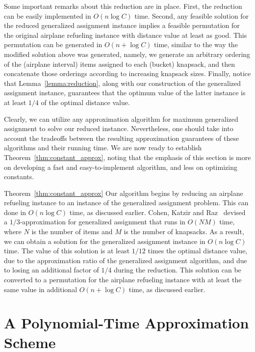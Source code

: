 \documentclass[11pt]{article}
\theoremstyle{plain}
\theoremstyle{definition}
\begin{document}
Some important remarks about this reduction are in place. First, the reduction can be easily implemented in $O(n \log C)$ time. Second, any feasible solution for the reduced generalized assignment instance implies a feasible permutation for the original airplane refueling instance with distance value at least as good. This permutation can be generated in $O(n + \log C)$ time, similar to the way the modified solution above was generated, namely, we generate an arbitrary ordering of the (airplane interval) items assigned to each (bucket) knapsack, and then concatenate those orderings according to increasing knapsack sizes. Finally, notice that Lemma~\ref{lemma:reduction}, along with our construction of the generalized assignment instance, guarantees that the optimum value of the latter instance is at least $1/4$ of the optimal distance value. 

\smallskip {} Clearly, we can utilize any approximation algorithm for maximum generalized assignment to solve our reduced instance. Nevertheless, one should take into account the tradeoffs between the resulting approximation guarantees of these algorithms and their running time. We are now ready to establish Theorem~\ref{thm:constant_approx}, noting that the emphasis of this section is more on developing a fast and easy-to-implement algorithm, and less on optimizing constants.

\begin{proofof}{Theorem~\ref{thm:constant_approx}}
Our algorithm begins by reducing an airplane refueling instance to an instance of the generalized assignment problem. This can done in $O(n \log C)$ time, as discussed earlier. Cohen, Katzir and Raz~\cite{CohenKR06} devised a $1/3$-approximation for generalized assignment that runs in $O(NM)$ time, where $N$ is the number of items and $M$ is the number of knapsacks. As a result, we can obtain a solution for the generalized assignment instance in $O(n \log C)$ time. The value of this solution is at least $1/12$ times the optimal distance value, due to the approximation ratio of the generalized assignment algorithm, and due to losing an additional factor of $1/4$ during the reduction. This solution can be converted to a permutation for the airplane refueling instance with at least the same value in additional $O(n + \log C)$ time, as discussed earlier.
\end{proofof}



\section{A Polynomial-Time Approximation Scheme} \label{sec:ptas}
\end{document}
